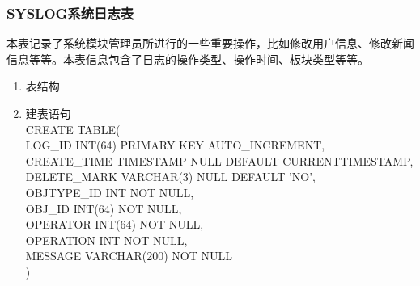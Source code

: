 \subsubsection{SYSLOG系统日志表}
本表记录了系统模块管理员所进行的一些重要操作，比如修改用户信息、修改新闻信息等等。本表信息包含了日志的操作类型、操作时间、板块类型等等。
\begin{enumerate}
    \item 表结构
    \begin{table}[htbp]
        \centering
        \end{table}
    \item 建表语句\\
        CREATE TABLE(\\
            LOG\_ID INT(64) PRIMARY KEY AUTO\_INCREMENT,\\
            CREATE\_TIME TIMESTAMP NULL DEFAULT CURRENTTIMESTAMP,\\
            DELETE\_MARK VARCHAR(3) NULL DEFAULT 'NO',\\
            OBJTYPE\_ID INT NOT NULL,\\
            OBJ\_ID INT(64) NOT NULL,\\
            OPERATOR INT(64) NOT NULL, \\
            OPERATION INT NOT NULL, \\
            MESSAGE VARCHAR(200) NOT NULL\\
        )
    \end{enumerate}

